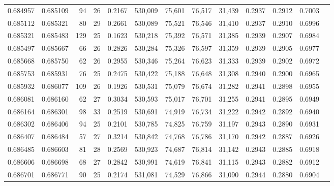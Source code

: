 \begin{tabular}{rrrrrrrrrrrrr}
0.684957 & 0.685109 &    94 &  26 &                                     0.2167 & 530,009 &  75,601 &  76,517 &  31,439 & 0.2937 & 0.2912 & 0.7003 \\
0.685112 & 0.685321 &    80 &  29 &                                     0.2661 & 530,089 &  75,521 &  76,546 &  31,410 & 0.2937 & 0.2910 & 0.6996 \\
0.685321 & 0.685483 &   129 &  25 &                                     0.1623 & 530,218 &  75,392 &  76,571 &  31,385 & 0.2939 & 0.2907 & 0.6984 \\
0.685497 & 0.685667 &    66 &  26 &                                     0.2826 & 530,284 &  75,326 &  76,597 &  31,359 & 0.2939 & 0.2905 & 0.6977 \\
0.685668 & 0.685750 &    62 &  26 &                                     0.2955 & 530,346 &  75,264 &  76,623 &  31,333 & 0.2939 & 0.2902 & 0.6972 \\
0.685753 & 0.685931 &    76 &  25 &                                     0.2475 & 530,422 &  75,188 &  76,648 &  31,308 & 0.2940 & 0.2900 & 0.6965 \\
0.685932 & 0.686077 &   109 &  26 &                                     0.1926 & 530,531 &  75,079 &  76,674 &  31,282 & 0.2941 & 0.2898 & 0.6955 \\
0.686081 & 0.686160 &    62 &  27 &                                     0.3034 & 530,593 &  75,017 &  76,701 &  31,255 & 0.2941 & 0.2895 & 0.6949 \\
0.686164 & 0.686301 &    98 &  33 &                                     0.2519 & 530,691 &  74,919 &  76,734 &  31,222 & 0.2942 & 0.2892 & 0.6940 \\
0.686302 & 0.686406 &    94 &  25 &                                     0.2101 & 530,785 &  74,825 &  76,759 &  31,197 & 0.2943 & 0.2890 & 0.6931 \\
0.686407 & 0.686484 &    57 &  27 &                                     0.3214 & 530,842 &  74,768 &  76,786 &  31,170 & 0.2942 & 0.2887 & 0.6926 \\
0.686485 & 0.686603 &    81 &  28 &                                     0.2569 & 530,923 &  74,687 &  76,814 &  31,142 & 0.2943 & 0.2885 & 0.6918 \\
0.686606 & 0.686698 &    68 &  27 &                                     0.2842 & 530,991 &  74,619 &  76,841 &  31,115 & 0.2943 & 0.2882 & 0.6912 \\
0.686701 & 0.686771 &    90 &  25 &                                     0.2174 & 531,081 &  74,529 &  76,866 &  31,090 & 0.2944 & 0.2880 & 0.6904 \\

\end{tabular}
